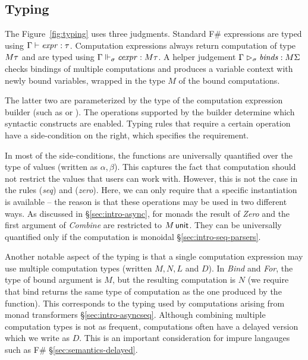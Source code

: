 \documentclass[runningheads,a4paper]{llncs}
\begin{document}

\subsection{Typing}
\label{sec:semantics-typing}

The Figure~\ref{fig:typing} uses three judgments. Standard F\# 
expressions are typed using $\Gamma \vdash \textnormal{\emph{expr}} : \tau$. Computation expressions always return
computation of type $M \tau$ and are typed using $\Gamma \Vdash_\sigma \textnormal{\emph{cexpr}} : M \tau$.
A helper judgement $\Gamma \vartriangleright_\sigma \textnormal{\emph{binds}} : M \Sigma$ checks bindings
of multiple computations and produces a variable context with newly bound variables, 
wrapped in the type $M$ of the bound computations.

The latter two are parameterized by the type of the computation expression builder (such as
 or ). The operations supported by the builder determine which syntactic
constructs are enabled. Typing rules that require a certain operation have a side-condition
on the right, which specifies the requirement.

In most of the side-conditions, the functions are universally quantified over the type of values
(written as $\alpha, \beta$). This captures the fact that computation should not restrict the 
values that users can work with. However, this is not the case in the rules (\emph{seq}) and 
(\emph{zero}). Here, we can only require that a specific instantiation is available -- the reason 
is that these operations may be used in two different ways. As discussed in \S\ref{sec:intro-async}, 
for monads the result of \emph{Zero} and the first argument of \emph{Combine} are restricted to
$M\,\textnormal{\sffamily unit}$. They can be universally quantified only if the computation is monoidal 
\S\ref{sec:intro-seq-parsers}.

Another notable aspect of the typing is that a single computation expression may use multiple
computation types (written $M, N, L$ and $D$). In \emph{Bind} and \emph{For}, the type of bound
argument is $M$, but the resulting computation is $N$ (we require that bind returns the same
type of computation as the one produced by the function). This corresponds to the typing used
by computations arising from monad transformers \S\ref{sec:intro-asyncseq}. Although combining
multiple computation types is not as frequent, computations often have a delayed version which
we write as $D$. This is an important consideration for impure langauges such as F\# 
\S\ref{sec:semantics-delayed}.
\end{document}
